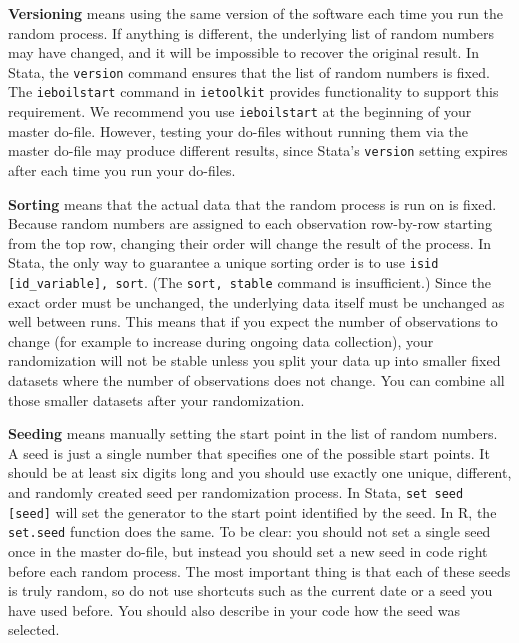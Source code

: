 \textbf{Versioning} means using the same version of the software each time you run the random process.
If anything is different, the underlying list of random numbers may have changed,
and it will be impossible to recover the original result.
In Stata, the \texttt{version} command ensures that the list of random numbers is fixed.
The \texttt{ieboilstart} command in \texttt{ietoolkit} provides functionality to support this requirement.
We recommend you use \texttt{ieboilstart} at the beginning of your master do-file.
However, testing your do-files without running them
via the master do-file may produce different results,
since Stata's \texttt{version} setting expires after each time you run your do-files.

\textbf{Sorting} means that the actual data that the random process is run on is fixed.
Because random numbers are assigned to each observation row-by-row starting from
the top row,
changing their order will change the result of the process.
In Stata, the only way to guarantee a unique sorting order is to use
\texttt{isid [id\_variable], sort}.
(The \texttt{sort, stable} command is insufficient.)
Since the exact order must be unchanged,
the underlying data itself must be unchanged as well between runs.
This means that if you expect the number of observations to change
(for example to increase during ongoing data collection),
your randomization will not be stable unless you split your data up into
smaller fixed datasets where the number of observations does not change.
You can combine all
those smaller datasets after your randomization.


\textbf{Seeding} means manually setting the start point in the list of random numbers.
A seed is just a single number that specifies one of the possible start points.
It should be at least six digits long and you should use exactly
one unique, different, and randomly created seed per randomization process.
In Stata, \texttt{set seed [seed]} will set the generator
to the start point identified by the seed.
In R, the \texttt{set.seed} function does the same.
To be clear: you should not set a single seed once in the master do-file,
but instead you should set a new seed in code right before each random process.
The most important thing is that each of these seeds is truly random,
so do not use shortcuts such as the current date or a seed you have used before.
You should also describe in your code how the seed was selected.

